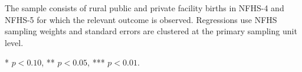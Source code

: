 \documentclass[12pt]{article}
\begin{document}
\begin{landscape}
\begin{table}[H]
\begin{threeparttable}
\begin{minipage}{0.92\textwidth}
            The sample consists of rural public and private facility births
            in NFHS-4 and NFHS-5 for which the relevant outcome is observed.
            Regressions use NFHS sampling weights and standard errors are
            clustered at the primary sampling unit level.

            * $p<0.10$, ** $p<0.05$, *** $p<0.01$.
        \end{minipage}

    \end{threeparttable}

\end{table}

\setlength{\tabcolsep}{6pt}
\renewcommand{\arraystretch}{1}

\end{landscape}


\clearpage


\end{document}
